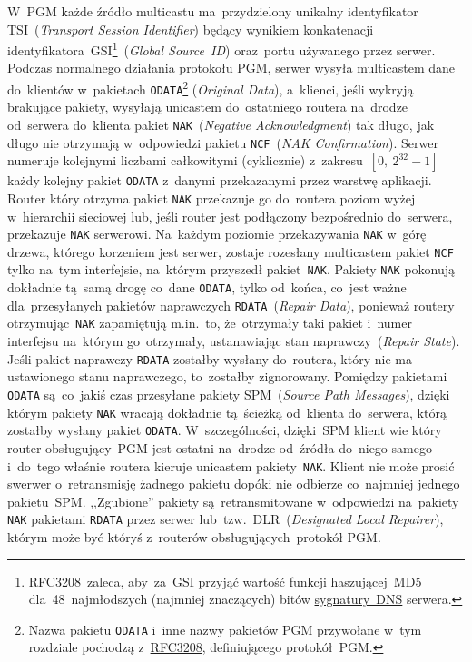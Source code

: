 \documentclass[thesis]{subfiles}
\begin{document}
W~PGM każde źródło multicastu ma~przydzielony unikalny identyfikator TSI~(\emph{Transport Session Identifier}) będący wynikiem konkatenacji identyfikatora~GSI\footnote{\href{https://tools.ietf.org/html/rfc3208\#page-33}{RFC3208~zaleca}, aby~za~GSI przyjąć wartość funkcji haszującej~\href{https://en.wikipedia.org/wiki/MD5}{MD5} dla~48~najmłodszych (najmniej znaczących) bitów \href{https://tools.ietf.org/html/rfc2535\#section-4}{sygnatury~DNS} serwera.}~(\emph{Global Source~ID}) oraz~portu używanego przez serwer. Podczas normalnego działania protokołu PGM, serwer wysyła multicastem dane do~klientów w~pakietach \texttt{ODATA}\footnote{Nazwa pakietu \texttt{ODATA} i~inne nazwy pakietów PGM przywołane w~tym rozdziale pochodzą z~\href{https://tools.ietf.org/html/rfc3208}{RFC3208}, definiującego protokół~PGM.} (\emph{Original Data}), a~klienci, jeśli wykryją brakujące pakiety, wysyłają unicastem do~ostatniego routera na~drodze od~serwera do~klienta pakiet \texttt{NAK}~(\emph{Negative Acknowledgment}) tak długo, jak długo nie otrzymają w~odpowiedzi pakietu \texttt{NCF}~(\emph{NAK Confirmation}). Serwer numeruje kolejnymi liczbami całkowitymi (cyklicznie) z~zakresu~$[0,~2^{32}-1]$ każdy kolejny pakiet \texttt{ODATA} z~danymi przekazanymi przez warstwę aplikacji. Router który otrzyma pakiet \texttt{NAK} przekazuje go do~routera poziom wyżej w~hierarchii sieciowej lub, jeśli router jest podłączony bezpośrednio do~serwera, przekazuje \texttt{NAK} serwerowi. Na~każdym poziomie przekazywania \texttt{NAK} w~górę drzewa, którego korzeniem jest serwer, zostaje rozesłany multicastem pakiet \texttt{NCF} tylko na~tym interfejsie, na~którym przyszedł pakiet~\texttt{NAK}. Pakiety \texttt{NAK} pokonują dokładnie tą~samą drogę co~dane \texttt{ODATA}, tylko od~końca, co~jest ważne dla~przesyłanych pakietów naprawczych \texttt{RDATA}~(\emph{Repair Data}), ponieważ routery otrzymując~\texttt{NAK} zapamiętują m.in.~to, że~otrzymały taki pakiet i~numer interfejsu na~którym go~otrzymały, ustanawiając stan naprawczy~(\emph{Repair State}). Jeśli pakiet naprawczy \texttt{RDATA} zostałby wysłany do~routera, który nie ma ustawionego stanu naprawczego, to~zostałby zignorowany. Pomiędzy pakietami \texttt{ODATA} są~co~jakiś czas przesyłane pakiety SPM~(\emph{Source Path Messages}), dzięki którym pakiety \texttt{NAK} wracają dokładnie tą~ścieżką od~klienta do~serwera, którą zostałby wysłany pakiet \texttt{ODATA}. W~szczególności, dzięki~SPM klient wie który router obsługujący~PGM jest ostatni na~drodze od~źródła do~niego samego i~do~tego właśnie routera kieruje unicastem pakiety~\texttt{NAK}. Klient nie może prosić swerwer o~retransmisję żadnego pakietu dopóki nie odbierze co~najmniej jednego pakietu~SPM. ,,Zgubione'' pakiety są~retransmitowane w~odpowiedzi na~pakiety \texttt{NAK} pakietami \texttt{RDATA} przez serwer lub~tzw.~DLR~(\emph{Designated Local Repairer}), którym może być któryś z~routerów obsługujących~protokół PGM.
\end{document}
